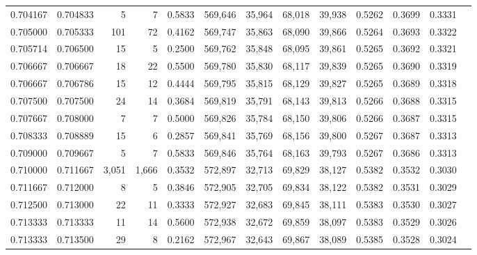 \begin{tabular}{rrrrrrrrrrrrr}
0.704167 & 0.704833 &      5 &     7 &                                     0.5833 & 569,646 &  35,964 &  68,018 &  39,938 & 0.5262 & 0.3699 & 0.3331 \\
0.705000 & 0.705333 &    101 &    72 &                                     0.4162 & 569,747 &  35,863 &  68,090 &  39,866 & 0.5264 & 0.3693 & 0.3322 \\
0.705714 & 0.706500 &     15 &     5 &                                     0.2500 & 569,762 &  35,848 &  68,095 &  39,861 & 0.5265 & 0.3692 & 0.3321 \\
0.706667 & 0.706667 &     18 &    22 &                                     0.5500 & 569,780 &  35,830 &  68,117 &  39,839 & 0.5265 & 0.3690 & 0.3319 \\
0.706667 & 0.706786 &     15 &    12 &                                     0.4444 & 569,795 &  35,815 &  68,129 &  39,827 & 0.5265 & 0.3689 & 0.3318 \\
0.707500 & 0.707500 &     24 &    14 &                                     0.3684 & 569,819 &  35,791 &  68,143 &  39,813 & 0.5266 & 0.3688 & 0.3315 \\
0.707667 & 0.708000 &      7 &     7 &                                     0.5000 & 569,826 &  35,784 &  68,150 &  39,806 & 0.5266 & 0.3687 & 0.3315 \\
0.708333 & 0.708889 &     15 &     6 &                                     0.2857 & 569,841 &  35,769 &  68,156 &  39,800 & 0.5267 & 0.3687 & 0.3313 \\
0.709000 & 0.709667 &      5 &     7 &                                     0.5833 & 569,846 &  35,764 &  68,163 &  39,793 & 0.5267 & 0.3686 & 0.3313 \\
0.710000 & 0.711667 &  3,051 & 1,666 &                                     0.3532 & 572,897 &  32,713 &  69,829 &  38,127 & 0.5382 & 0.3532 & 0.3030 \\
0.711667 & 0.712000 &      8 &     5 &                                     0.3846 & 572,905 &  32,705 &  69,834 &  38,122 & 0.5382 & 0.3531 & 0.3029 \\
0.712500 & 0.713000 &     22 &    11 &                                     0.3333 & 572,927 &  32,683 &  69,845 &  38,111 & 0.5383 & 0.3530 & 0.3027 \\
0.713333 & 0.713333 &     11 &    14 &                                     0.5600 & 572,938 &  32,672 &  69,859 &  38,097 & 0.5383 & 0.3529 & 0.3026 \\
0.713333 & 0.713500 &     29 &     8 &                                     0.2162 & 572,967 &  32,643 &  69,867 &  38,089 & 0.5385 & 0.3528 & 0.3024 \\

\end{tabular}
